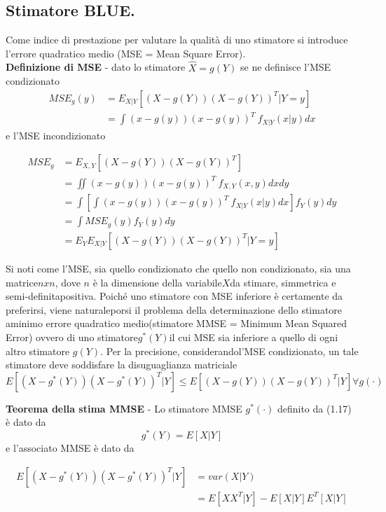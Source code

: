\subsection{Stimatore BLUE.}
Come indice di prestazione per valutare la qualità di uno stimatore si introduce l’errore quadratico medio (MSE = Mean Square Error).\\
\textbf{Definizione di MSE} - dato lo stimatore $\hat{X}=g(Y)$ se ne definisce l’MSE condizionato \\ 
\begin{align}
MSE_g(y)&= E_{X|Y}[(X-g(Y))(X-g(Y))^T|Y=y] \nonumber\\
&={\int{(x-g(y))(x-g(y))^T~f_{X|Y}(x|y)dx}}\nonumber  %
\end{align}
e l’MSE incondizionato

\begin{align}
MSE_g&= E_{X,Y}[(X-g(Y))(X-g(Y))^T]\nonumber\\
&=\iint{(x-g(y))(x-g(y))^T~f_{X,Y}(x,y)dxdy} \nonumber \\
&=\int{[\int{(x-g(y))(x-g(y))^T~f_{X|Y}(x|y)dx}]}f_Y(y)dy \nonumber\\
&=\int{MSE_g(y)f_Y(y)dy}\nonumber\\
&=E_Y{E_{X|Y}[(X-g(Y))(X-g(Y))^T|Y=y]}\nonumber
\end{align}

Si noti come l’MSE, sia quello condizionato che quello non condizionato, sia una matrice$nxn$, dove $n$ è la dimensione della variabile$X$da stimare, simmetrica e semi-definitapositiva. Poiché uno stimatore con MSE inferiore è certamente da preferirsi, viene naturaleporsi il problema della determinazione dello stimatore aminimo errore quadratico medio(stimatore MMSE = Minimum Mean Squared Error) ovvero di uno stimatore$g^*(Y)$il cui MSE sia inferiore a quello di ogni altro stimatore $g(Y)$. Per la precisione, considerandol’MSE condizionato, un tale stimatore deve soddisfare la disuguaglianza matriciale
\begin{equation}
E[(X-g^*(Y))(X-g^*(Y))^T|Y]\le E[(X-g(Y))(X-g(Y))^T|Y]\forall g(\cdot)
\end{equation} 
\newpage

\textbf{Teorema della stima MMSE } - Lo stimatore MMSE $g^*(\cdot)$ definito da (1.17) è dato da 
\begin{equation}
g^*(Y)=E[X|Y]
\end{equation}
e l’associato MMSE è dato da

\begin{align}
E[(X-g^*(Y))(X-g^*(Y))^T|Y]&=var(X|Y)\nonumber \\
&=E[XX^T|Y]-E[X|Y]E^T[X|Y] \nonumber \\
\end{align}

